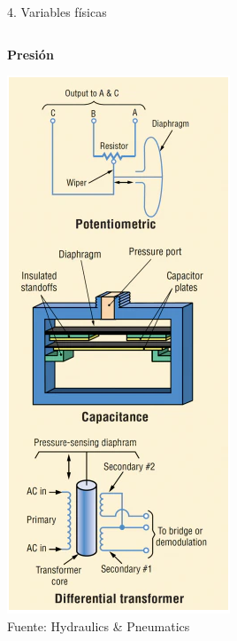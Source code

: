\documentclass[presentation,aspectratio=169]{beamer}
\begin{document}
\begin{frame}[label={sec:org972f843}]{4. Variables físicas}
\begin{columns}
\begin{column}{0.3\columnwidth}
\textbf{Presión}
\begin{center}
\includegraphics[width=0.67\linewidth]{../../figures/pressure-sensor.png}\\
{\footnotesize Fuente: Hydraulics \& Pneumatics}
\end{center}
\end{column}


\end{columns}
\end{frame}
\end{document}
